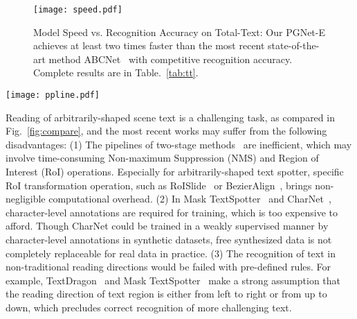 \documentclass[letterpaper]{article} \usepackage{aaai21}  \usepackage{times}  \usepackage{helvet} \usepackage{courier}  \usepackage[hyphens]{url}  \usepackage{graphicx} \urlstyle{rm} \def\UrlFont{\rm}  \usepackage{natbib}  \usepackage{caption} \usepackage{bm}
\begin{document}
\begin{figure}
    \centering
    \texttt{[image: speed.pdf]}
    \caption{Model Speed vs. Recognition Accuracy on Total-Text: Our PGNet-E achieves at least two times faster than the most recent state-of-the-art method ABCNet~\cite{liu2020abcnet} with competitive recognition accuracy. Complete results are in Table.~\ref{tab:tt}.}
    \label{fig:insight}
\end{figure}


\begin{figure*}
    \centering
    \texttt{[image: ppline.pdf]}
    \caption{Overview of some end-to-end scene text spotting methods that are most relevant to ours, and the blue and green boxes represent their detection and recognition results. Inside the GT (ground-truth) box, `W' and `C' represent word-level and character-level annotation. The `H', `Q', and `A' represent that the method can detect horizontal, quadrilateral, and arbitrarily-shaped text, respectively. Our method is free from character-level annotations, NMS, and RoI operations.}
\label{fig:compare}
\end{figure*}


Reading of arbitrarily-shaped scene text is a challenging task, as compared in Fig.~\ref{fig:compare}, and the most recent works may suffer from the following disadvantages: (1) The pipelines of two-stage methods~\cite{sun2018textnet, yao2018mask, feng2019textdragon, liu2020abcnet} are inefficient, which may involve time-consuming  Non-maximum Suppression (NMS) and Region of Interest (RoI) operations. Especially for arbitrarily-shaped text spotter, specific RoI transformation operation, such as RoISlide~\cite{feng2019textdragon} or BezierAlign~\cite{liu2020abcnet}, brings non-negligible computational overhead. (2) In Mask TextSpotter~\cite{yao2018mask} and CharNet~\cite{xing2019convolutional}, character-level annotations are required for training, which is too expensive to afford. Though CharNet could be trained in a weakly supervised manner by character-level annotations in synthetic datasets, free synthesized data is not completely replaceable for real data in practice. (3) The recognition of text in non-traditional reading directions would be failed with pre-defined rules. For example, TextDragon~\cite{feng2019textdragon} and Mask TextSpotter~\cite{yao2018mask} make a strong assumption that the reading direction of text region is either from left to right or from up to down, which precludes correct recognition of more challenging text.
\end{document}
